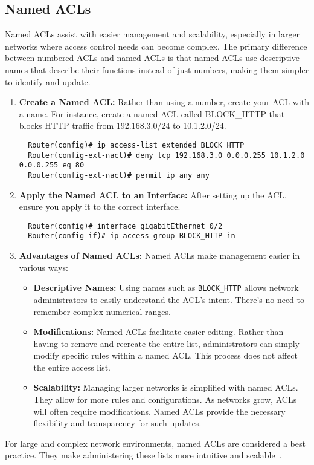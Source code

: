 \documentclass[11pt,a4paper]{article}
\begin{document}
    \subsection*{Named ACLs}
    Named ACLs assist with easier management and scalability, especially in larger networks where access control needs can become complex. The primary difference between numbered ACLs and named ACLs is that named ACLs use descriptive names that describe their functions instead of just numbers, making them simpler to identify and update.
        \begin{enumerate}
            \item \textbf{Create a Named ACL:} Rather than using a number, create your ACL with a name. For instance, create a named ACL called BLOCK\_HTTP that blocks HTTP traffic from 192.168.3.0/24 to 10.1.2.0/24.
\begin{lstlisting}
  Router(config)# ip access-list extended BLOCK_HTTP
  Router(config-ext-nacl)# deny tcp 192.168.3.0 0.0.0.255 10.1.2.0 0.0.0.255 eq 80
  Router(config-ext-nacl)# permit ip any any
\end{lstlisting}
            \item \textbf{Apply the Named ACL to an Interface:} After setting up the ACL, ensure you apply it to the correct interface.
\begin{lstlisting}
  Router(config)# interface gigabitEthernet 0/2
  Router(config-if)# ip access-group BLOCK_HTTP in                
\end{lstlisting}
            
            \item \textbf{Advantages of Named ACLs:} Named ACLs make management easier in various ways:
                \begin{itemize}
                    \item \textbf{Descriptive Names:} Using names such as \lstinline{BLOCK_HTTP}  allows network administrators to easily understand the ACL's intent. There’s no need to remember complex numerical ranges.

                    \item \textbf{Modifications:} Named ACLs facilitate easier editing. Rather than having to remove and recreate the entire list, administrators can simply modify specific rules within a named ACL. This process does not affect the entire access list.

                    \item \textbf{Scalability:} Managing larger networks is simplified with named ACLs. They allow for more rules and configurations. As networks grow, ACLs will often require modifications. Named ACLs provide the necessary flexibility and transparency for such updates.
                \end{itemize}

        \end{enumerate}
        For large and complex network environments, named ACLs are considered a best practice. They make administering these lists more intuitive and scalable~\cite{Configuring-Named-ACLs}.
\end{document}
